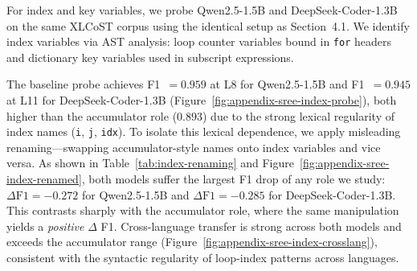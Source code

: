 
\label{sec:index}
For index and key variables, we probe Qwen2.5-1.5B and DeepSeek-Coder-1.3B on
the same XLCoST corpus using the identical setup as Section~4.1. We identify
index variables via AST analysis: loop counter variables bound in \texttt{for}
headers and dictionary key variables used in subscript expressions.

The baseline probe achieves F1~$= 0.959$ at L8 for Qwen2.5-1.5B and
F1~$= 0.945$ at L11 for DeepSeek-Coder-1.3B
(Figure~\ref{fig:appendix-sree-index-probe}), both higher than the accumulator
role ($0.893$) due to the strong lexical regularity of index names (\texttt{i},
\texttt{j}, \texttt{idx}). To isolate this lexical dependence, we apply
misleading renaming---swapping accumulator-style names onto index variables and
vice versa. As shown in Table~\ref{tab:index-renaming} and
Figure~\ref{fig:appendix-sree-index-renamed}, both models suffer the largest F1
drop of any role we study: $\Delta\text{F1} = {-}0.272$ for Qwen2.5-1.5B and
$\Delta\text{F1} = {-}0.285$ for DeepSeek-Coder-1.3B. This contrasts sharply
with the accumulator role, where the same manipulation yields a \emph{positive}
$\Delta$ F1. Cross-language transfer is strong across both models and exceeds
the accumulator range (Figure~\ref{fig:appendix-sree-index-crosslang}),
consistent with the syntactic regularity of loop-index patterns across languages.

